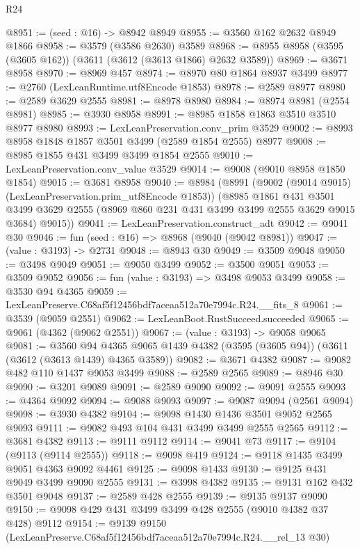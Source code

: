 \begin{lexlean}{R24}
\begin{coremodule}
@8951 := (seed : @16) -> @8942 @8949
@8955 := @3560 @162 @2632 @8949 @1866
@8958 := @3579 (@3586 @2630) @3589
@8968 := @8955 @8958 (@3595 (@3605 @162)) (@3611 (@3612 (@3613 @1866) @2632 @3589))
@8969 := @3671 @8958
@8970 := @8969 @457
@8974 := @8970 @80 @1864 @8937 @3499
@8977 := @2760 (LexLeanRuntime.utf8Encode @1853)
@8978 := @2589 @8977
@8980 := @2589 @3629 @2555
@8981 := @8978 @8980
@8984 := @8974 @8981 (@2554 @8981)
@8985 := @3930 @8958
@8991 := @8985 @1858 @1863 @3510 @3510 @8977 @8980
@8993 := LexLeanPreservation.conv_prim @3529
@9002 := @8993 @8958 @1848 @1857 @3501 @3499 (@2589 @1854 @2555) @8977
@9008 := @8985 @1855 @431 @3499 @3499 @1854 @2555
@9010 := LexLeanPreservation.conv_value @3529
@9014 := @9008 (@9010 @8958 @1850 @1854)
@9015 := @3681 @8958
@9040 := @8984
    (@8991
      (@9002 (@9014 @9015) (LexLeanPreservation.prim_utf8Encode @1853))
      (@8985
        @1861
        @431
        @3501
        @3499
        @3629
        @2555
        (@8969 @860 @231 @431 @3499 @3499 @2555 @3629 @9015 @3684)
        @9015))
@9041 := LexLeanPreservation.construct_adt
@9042 := @9041 @30
@9046 := fun (seed : @16) => @8968 (@9040 (@9042 @8981))
@9047 := (value : @3193) -> @2731
@9048 := @8943 @30
@9049 := @3509 @9048
@9050 := @3498 @9049
@9051 := @9050 @3499
@9052 := @3500 @9051
@9053 := @3509 @9052
@9056 := fun (value : @3193) => @3498 @9053 @3499
@9058 := @3530 @94 @4365
@9059 := LexLeanPreserve.C68af5f12456bdf7aceaa512a70e7994c.R24.__fits_8
@9061 := @3539 (@9059 @2551)
@9062 := LexLeanBoot.RustSucceed.succeeded
@9065 := @9061 (@4362 (@9062 @2551))
@9067 := (value : @3193) -> @9058 @9065
@9081 := @3560
    @94
    @4365
    @9065
    @1439
    @4382
    (@3595 (@3605 @94))
    (@3611 (@3612 (@3613 @1439) @4365 @3589))
@9082 := @3671 @4382
@9087 := @9082 @482 @110 @1437 @9053 @3499
@9088 := @2589 @2565
@9089 := @8946 @30
@9090 := @3201 @9089
@9091 := @2589 @9090
@9092 := @9091 @2555
@9093 := @4364 @9092
@9094 := @9088 @9093
@9097 := @9087 @9094 (@2561 @9094)
@9098 := @3930 @4382
@9104 := @9098 @1430 @1436 @3501 @9052 @2565 @9093
@9111 := @9082 @493 @104 @431 @3499 @3499 @2555 @2565
@9112 := @3681 @4382
@9113 := @9111 @9112
@9114 := @9041 @73
@9117 := @9104 (@9113 (@9114 @2555))
@9118 := @9098 @419
@9124 := @9118 @1435 @3499 @9051 @4363 @9092 @4461
@9125 := @9098 @1433
@9130 := @9125 @431 @9049 @3499 @9090 @2555
@9131 := @3998 @4382
@9135 := @9131 @162 @432 @3501 @9048
@9137 := @2589 @428 @2555
@9139 := @9135 @9137 @9090
@9150 := @9098 @429 @431 @3499 @3499 @428 @2555 (@9010 @4382 @37 @428) @9112
@9154 := @9139 @9150 (LexLeanPreserve.C68af5f12456bdf7aceaa512a70e7994c.R24.__rel_13 @30)

\end{coremodule}
\end{lexlean}
